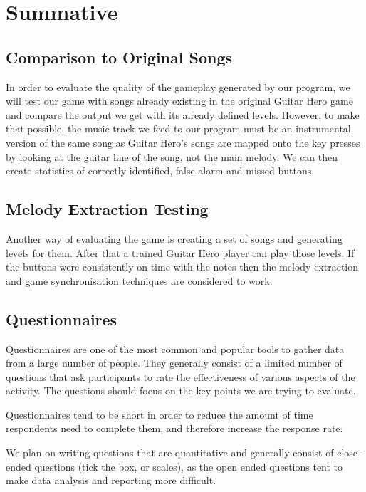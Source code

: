 \section{Summative}
\subsection{Comparison to Original Songs}
In order to evaluate the quality of the gameplay generated by our program, we will test our game with songs already existing in the original Guitar Hero game and compare the output we get with its already defined levels. However, to make that possible, the music track we feed to our program must be an instrumental version of the same song as Guitar Hero's songs are mapped onto the key presses by looking at the guitar line of the song, not the main melody. We can then create statistics of correctly identified, false alarm and missed buttons.

\subsection{Melody Extraction Testing}
Another way of evaluating the game is creating a set of songs and generating levels for them. After that a trained Guitar Hero player can play those levels. If the buttons were consistently on time with the notes then the melody extraction and game synchronisation techniques are considered to work.

\subsection{Questionnaires}
Questionnaires are one of the most common and popular tools to gather data from a large number of people. They generally consist of a limited number of questions that ask participants to rate the effectiveness of various aspects of the activity. The questions should focus on the key points we are trying to evaluate. 

Questionnaires tend to be short in order to reduce the amount of time respondents need to complete them, and therefore increase the response rate. 

We plan on writing questions that are quantitative and generally consist of close-ended questions (tick the box, or scales), as the open ended questions tent to make data analysis and reporting more difficult.